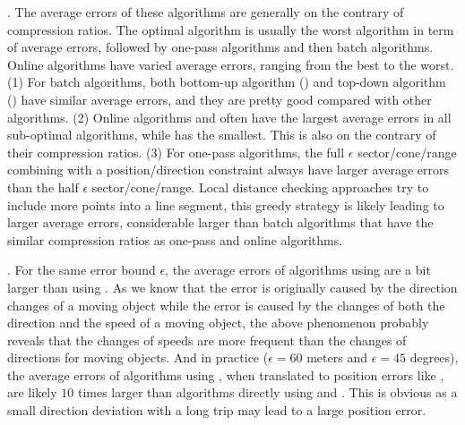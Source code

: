 . The average errors of these algorithms  are generally on the contrary of compression ratios. The optimal algorithm is usually  the worst algorithm in term of average errors, followed by one-pass algorithms and then batch algorithms.
Online algorithms have varied average errors, ranging from the best to the worst.
(1) For batch algorithms, both bottom-up algorithm (\tpa) and top-down algorithm (\dpa) have similar average errors, and they are pretty good compared with other algorithms.
%
(2) Online algorithms \bqsa and \opwa often have the largest average errors in all sub-optimal algorithms, while \squishe has the smallest. This is also on the contrary of their compression ratios.
%
(3) For one-pass algorithms, the full $\epsilon$ sector/cone/range combining with a position/direction constraint always have larger average errors than the half $\epsilon$ sector/cone/range.
%
Local distance checking approaches try to include more points into a line segment, this greedy strategy is likely leading to larger average errors, considerable larger than batch algorithms that have the similar compression ratios as one-pass and online algorithms.


.
For the same error bound $\epsilon$, the average errors of algorithms using \sed are a bit larger than using \ped. {As we know that the \ped error is originally caused by the direction changes  of a moving object while the \sed error is caused by the changes of both the direction and the speed of a moving object, the above phenomenon probably reveals that the changes of speeds are more frequent than the changes of directions for moving objects.}
%
And in practice (\eg $\epsilon = 60$ meters and $\epsilon = 45$ degrees), the average errors of algorithms using \dad, when translated to position errors like \ped, are likely $10$ times larger than algorithms directly using \ped and \sed. This is obvious as a small direction deviation with a long trip may lead to a large position error.





